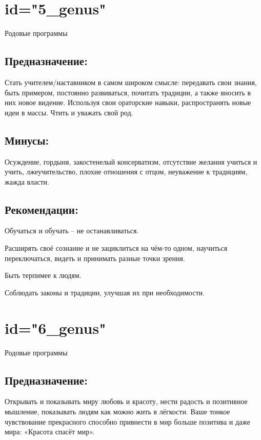\endsection

\section{id="5_genus"}{Родовые программы}

\subsection{Предназначение:}
Стать учителем/наставником в самом широком смысле: передавать свои 
знания, быть примером, постоянно развиваться, почитать традиции, 
а также вносить в них новое видение. Используя свои ораторские 
навыки, распространять новые идеи в массы.
Чтить и уважать свой род.
\endsubsection

\subsection{Минусы:}
Осуждение, гордыня, закостенелый консерватизм, отсутствие желания 
учиться и учить, лжеучительство, плохие отношения с отцом, неуважение 
к традициям, жажда власти.
\endsubsection

\subsection{Рекомендации:}
\item Обучаться и обучать – не останавливаться.
\item Расширять своё сознание и не зациклиться на чём-то одном, 
научиться переключаться, видеть и принимать разные точки зрения.
\item Быть терпимее к людям.
\item Соблюдать законы и традиции, улучшая их при необходимости.
\endsubsection

\endsection

\section{id="6_genus"}{Родовые программы}

\subsection{Предназначение:}
Открывать и показывать миру любовь и красоту, нести радость и 
позитивное мышление, показывать людям как можно жить в лёгкости. 
Ваше тонкое чувствование прекрасного способно привнести в мир 
больше позитива и даже мира: «Красота спасёт мир».
\endsubsection

